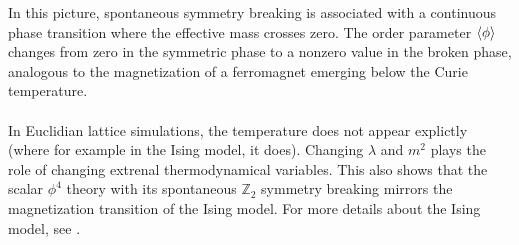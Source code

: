 In this picture, spontaneous symmetry breaking is associated with a continuous phase transition where the effective mass crosses zero. The order parameter $\braket{\phi}$ changes from zero in the symmetric phase to a nonzero value in the broken phase, analogous to the magnetization of a ferromagnet emerging below the Curie temperature.
\\\\
In Euclidian lattice simulations, the temperature does not appear explictly (where for example in the Ising model, it does). Changing $\lambda$ and $m^2$ plays the role of changing extrenal thermodynamical variables. This also shows that the scalar $\phi^4$ theory with its spontaneous $\mathbb{Z}_2$ symmetry breaking mirrors the magnetization transition of the Ising model. For more details about the Ising model, see \cite{WieseThermodynamics}. 
